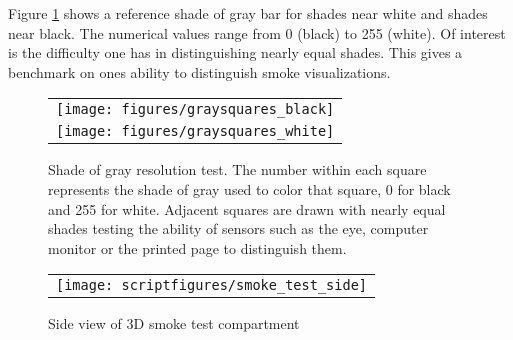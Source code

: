 \documentclass[11pt,twoside]{book}
\newcommand{\figoptions}{hbp}
\begin{document}
Figure \ref{figgraysquare} shows a reference shade of gray bar for shades near white and shades near black.
The numerical values range from 0 (black) to 255 (white).  Of interest is the difficulty one has in distinguishing nearly equal shades.  This gives a benchmark on ones ability to distinguish smoke visualizations.
\begin{figure}[\figoptions]
\begin{center}
 \centering
\begin{tabular}{c}
\texttt{[image: figures/graysquares\_black]}\\
\texttt{[image: figures/graysquares\_white]}\\
 \end{tabular}
\end{center}
 \caption[Shade of gray resolution test.]{Shade of gray resolution test.
 The number within each square represents the shade of gray used to color that square,
 0 for black and 255 for white.  Adjacent squares are drawn with nearly equal shades
 testing the ability of sensors such as the eye, computer monitor or the printed page
 to distinguish them.
 }
\label{figgraysquare}%
\end{figure}

\begin{figure}[\figoptions]
\begin{center}
 \centering
\begin{tabular}{c}
 \texttt{[image: scriptfigures/smoke\_test\_side]}
 \end{tabular}
\end{center}
 \caption[Side view of 3D smoke test compartment]{Side view of 3D smoke test compartment}
\label{figsmoketestgeom}%
\end{figure}
\end{document}
